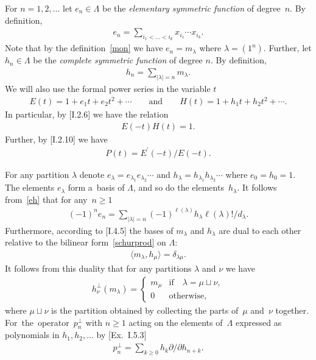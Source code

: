 \documentclass[pdftex]{sigma}
\numberwithin{equation}{section}
\renewcommand\ge{\geqslant}
\begin{document}
For $n=1,2,\ldots$ let $e_n\in\Lambda$ be the \textit{elementary symmetric function} of degree~$n$.
By def\/inition,
\begin{gather*}
e_n=\sum_{i_1<\dots<i_k}x_{i_1}\cdots x_{i_k}.
\end{gather*}
Note that by the def\/inition~\eqref{mon} we have $e_n=m_\lambda$ where $\lambda=(1^n)$.
Further, let $h_n\in\Lambda$ be the \textit{complete symmetric function} of degree $n$.
By def\/inition,
\begin{gather*}
h_n=\sum_{|\lambda|=n}m_\lambda.
\end{gather*}
We will also use the formal power series in the variable $t$
\begin{gather*}
E(t)=1+e_1t+e_2t^2+\cdots
\qquad
\text{and}
\qquad
H(t)=1+h_1t+h_2t^2+\cdots.
\end{gather*}
In particular, by [I.2.6] we have the relation
\begin{gather}
\label{eh}
E(-t)H(t)=1.
\end{gather}
Further, by [I.2.10] we have
\begin{gather}
\label{hep}
P(t)=E^{\prime}(-t)/E(-t).
\end{gather}

For any partition $\lambda$ denote $ e_\lambda=e_{\lambda_1}e_{\lambda_2}\cdots $ and $
h_\lambda=h_{\lambda_1}h_{\lambda_2}\cdots $ where $e_0=h_0=1$.
The elements $e_\lambda$ form a~basis of $\Lambda$, and so do the elements~$h_\lambda$.
It follows from~\eqref{eh} that for any~$n\ge1$
\begin{gather}
\label{ehnu}
(-1)^ne_n=\sum_{|\lambda|=n}(-1)^{\ell(\lambda)}h_\lambda\ell(\lambda)
!/d_\lambda.
\end{gather}
Furthermore, according to [I.4.5] the bases of $m_\lambda$ and $h_\lambda$ are dual to each other relative
to the bilinear form~\eqref{schurprod} on $\Lambda$:
\begin{gather}
\label{mh}
\langle m_\lambda,h_\mu\rangle=\delta_{\lambda\mu}.
\end{gather}
It follows from this duality that for any partitions $\lambda$ and $\nu$ we have
\begin{gather}
\label{hperp}
h_\nu^\perp(m_\lambda)=
\begin{cases}
m_\mu&\text{if}\quad\lambda=\mu\sqcup\nu,
\\
0&\text{otherwise,}
\end{cases}
\end{gather}
where $\mu\sqcup\nu$ is the partition obtained by collecting the parts of~$\mu$ and~$\nu$ together.
For~the~opera\-tor~$p_n^{\perp}$ with $n\ge1$ acting on the elements of~$\Lambda$ expressed as
polynomials in $h_1, h_2, \ldots$ by [Ex.~I.5.3]
\begin{gather}
\label{pperp}
p_n^{\perp}=\sum_{k\ge0}h_k\partial /\partial h_{n+k}.
\end{gather}
\end{document}
